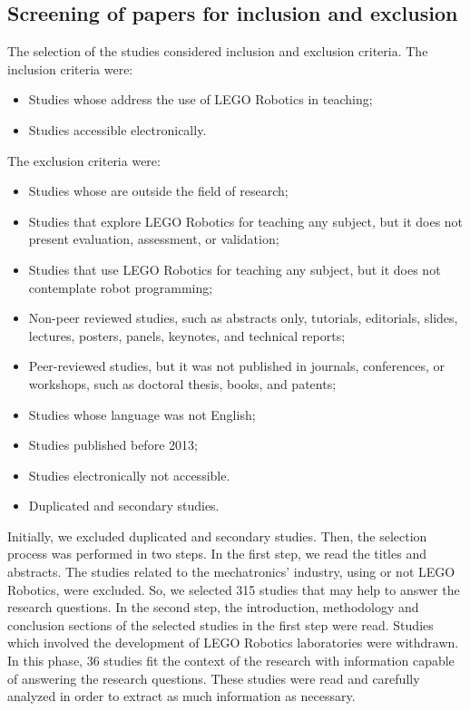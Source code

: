 \documentclass[conference]{IEEEtran}
\begin{document}
\subsection{Screening of papers for inclusion and exclusion}

The selection of the studies considered inclusion and exclusion criteria. The inclusion criteria were:
\begin{itemize}
\item Studies whose address the use of LEGO Robotics in teaching;
\item Studies accessible electronically.
\end{itemize}

The exclusion criteria were:
\begin{itemize}
\item Studies whose are outside the field of research;
\item Studies that explore LEGO Robotics for teaching any subject, but it does not present evaluation, assessment, or validation;
\item Studies that use LEGO Robotics for teaching any subject, but it does not contemplate robot programming;
\item Non-peer reviewed studies, such as abstracts only, tutorials, editorials, slides, lectures, posters, panels, keynotes, and technical reports;
\item Peer-reviewed studies, but it was not published in journals, conferences, or workshops, such as doctoral thesis, books, and patents;
\item Studies whose language was not English; 
\item Studies published before 2013;
\item Studies electronically not accessible.
\item Duplicated and secondary studies.
\end{itemize}

Initially, we excluded duplicated and secondary studies. Then, the selection process was performed in two steps. In the first step, we read the titles and abstracts. The studies related to the mechatronics’ industry, using or not LEGO Robotics, were excluded. So, we selected 315 studies that may help to answer the research questions. In the second step, the introduction, methodology and conclusion sections of the selected studies in the first step were read. Studies which involved the development of LEGO Robotics laboratories were withdrawn. In this phase, 36 studies fit the context of the research with information capable of answering the research questions. These studies were read and carefully analyzed in order to extract as much information as necessary.
\end{document}
